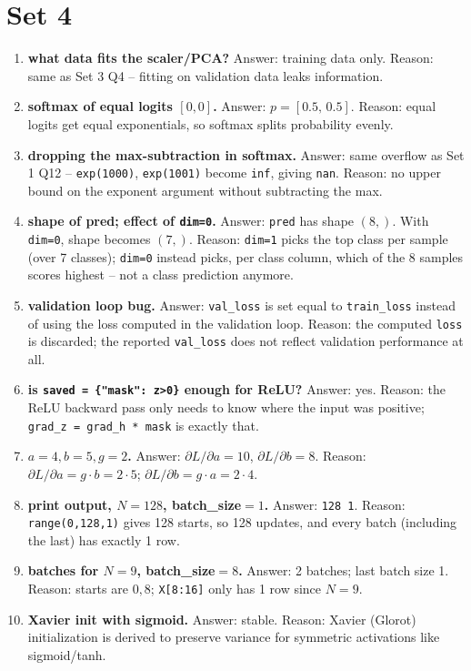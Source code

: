 \documentclass[11pt]{article}
\begin{document}
\section*{Set 4}
\begin{enumerate}

\item \textbf{what data fits the scaler/PCA?}
Answer: training data only. Reason: same as Set 3 Q4 -- fitting on
validation data leaks information.

\item \textbf{softmax of equal logits $[0,0]$.}
Answer: $p=[0.5,\,0.5]$.
Reason: equal logits get equal exponentials, so softmax splits probability
evenly.

\item \textbf{dropping the max-subtraction in softmax.}
Answer: same overflow as Set 1 Q12 -- \texttt{exp(1000)},
\texttt{exp(1001)} become \texttt{inf}, giving \texttt{nan}.
Reason: no upper bound on the exponent argument without subtracting the
max.

\item \textbf{shape of pred; effect of \texttt{dim=0}.}
Answer: \texttt{pred} has shape $(8,)$. With \texttt{dim=0}, shape becomes
$(7,)$.
Reason: \texttt{dim=1} picks the top class per sample (over 7 classes);
\texttt{dim=0} instead picks, per class column, which of the 8 samples
scores highest -- not a class prediction anymore.

\item \textbf{validation loop bug.}
Answer: \texttt{val\_loss} is set equal to \texttt{train\_loss} instead of
using the loss computed in the validation loop.
Reason: the computed \texttt{loss} is discarded; the reported
\texttt{val\_loss} does not reflect validation performance at all.

\item \textbf{is \texttt{saved = \{"mask": z>0\}} enough for ReLU?}
Answer: yes.
Reason: the ReLU backward pass only needs to know where the input was
positive; \texttt{grad\_z = grad\_h * mask} is exactly that.

\item \textbf{$a=4,b=5,g=2$.}
Answer: $\partial L/\partial a = 10$, $\partial L/\partial b = 8$.
Reason: $\partial L/\partial a = g\cdot b = 2\cdot5$;
$\partial L/\partial b = g\cdot a = 2\cdot4$.

\item \textbf{print output, $N=128$, batch\_size$=1$.}
Answer: \texttt{128 1}.
Reason: \texttt{range(0,128,1)} gives 128 starts, so 128 updates, and every
batch (including the last) has exactly 1 row.

\item \textbf{batches for $N=9$, batch\_size$=8$.}
Answer: 2 batches; last batch size 1.
Reason: starts are $0,8$; \texttt{X[8:16]} only has 1 row since $N=9$.

\item \textbf{Xavier init with sigmoid.}
Answer: stable.
Reason: Xavier (Glorot) initialization is derived to preserve variance for
symmetric activations like sigmoid/tanh.

\end{enumerate}
\end{document}
